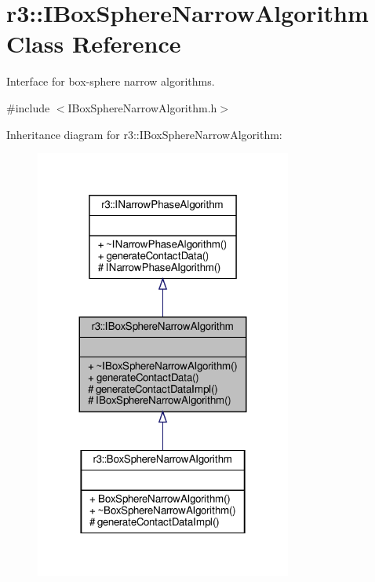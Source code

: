 \hypertarget{classr3_1_1_i_box_sphere_narrow_algorithm}{}\section{r3\+:\+:I\+Box\+Sphere\+Narrow\+Algorithm Class Reference}
\label{classr3_1_1_i_box_sphere_narrow_algorithm}


Interface for box-\/sphere narrow algorithms.  




{\ttfamily \#include $<$I\+Box\+Sphere\+Narrow\+Algorithm.\+h$>$}



Inheritance diagram for r3\+:\+:I\+Box\+Sphere\+Narrow\+Algorithm\+:\nopagebreak
\begin{figure}[H]
\begin{center}
\leavevmode
\includegraphics[width=239pt]{classr3_1_1_i_box_sphere_narrow_algorithm__inherit__graph}
\end{center}
\end{figure}


